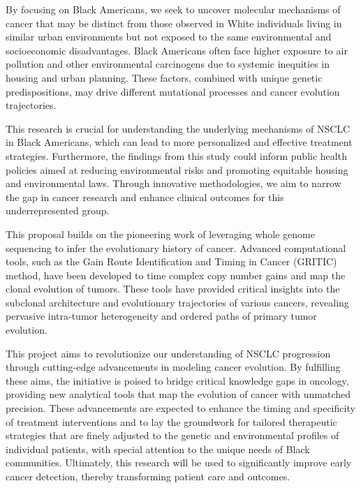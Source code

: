 \vspace{1em}
\noindent
By focusing on Black Americans, we seek to uncover molecular mechanisms of cancer that may be distinct 
from those observed in White individuals living in similar urban environments 
but not exposed to the same environmental and socioeconomic disadvantages. 
Black Americans often face higher exposure to air pollution and other environmental carcinogens due to systemic inequities in housing and urban planning. 
These factors, combined with unique genetic predispositions, may drive different mutational processes and cancer evolution trajectories.

\vspace{1em}
\noindent
This research is crucial for understanding the underlying mechanisms of NSCLC in Black Americans, 
which can lead to more personalized and effective treatment strategies. 
Furthermore, the findings from this study could inform public health policies aimed at reducing environmental risks 
and promoting equitable housing and environmental laws. 
Through innovative methodologies, we aim to narrow the gap in cancer research and enhance clinical outcomes for this underrepresented group.

\vspace{1em}
\noindent
This proposal builds on the pioneering work of leveraging whole genome sequencing to infer the evolutionary history of cancer. 
Advanced computational tools, such as the Gain Route Identification and Timing in Cancer (GRITIC) method, 
have been developed to time complex copy number gains and map the clonal evolution of tumors. 
These tools have provided critical insights into the subclonal architecture and evolutionary trajectories of various cancers, 
revealing pervasive intra-tumor heterogeneity and ordered paths of primary tumor evolution.

\vspace{1em}
\noindent
This project aims to revolutionize our understanding of NSCLC progression through cutting-edge advancements in modeling cancer evolution. 
By fulfilling these aims, the initiative is poised to bridge critical knowledge gaps in oncology, 
providing new analytical tools that map the evolution of cancer with unmatched precision. 
These advancements are expected to enhance the timing and specificity of treatment interventions 
and to lay the groundwork for tailored therapeutic strategies that are finely adjusted to the genetic and environmental profiles of individual patients, 
with special attention to the unique needs of Black communities. 
Ultimately, this research will be used to significantly improve early cancer detection, 
thereby transforming patient care and outcomes.

